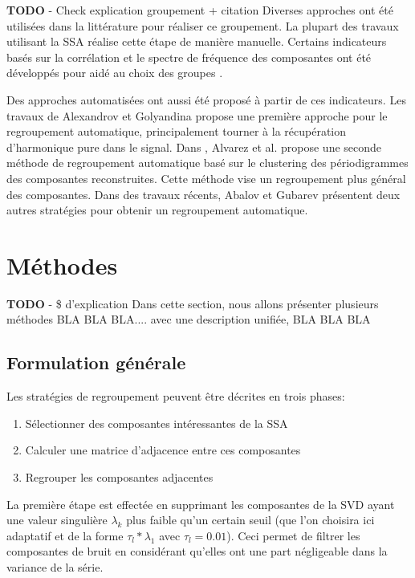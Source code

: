 \documentclass{gretsi}
\begin{document}
{\color{red} \textbf{TODO} - Check explication groupement + citation} 
Diverses approches ont été utilisées dans la littérature pour réaliser ce groupement. La plupart des travaux utilisant la SSA réalise cette étape de manière manuelle. Certains indicateurs basés sur la corrélation et le spectre de fréquence des composantes ont été développés pour aidé au choix des groupes \cite{GNZ_10_SSA}.

Des approches automatisées ont aussi été proposé à partir de ces indicateurs. Les travaux de Alexandrov et Golyandina \cite{alexandrov_05_auto} propose une première approche pour le regroupement automatique, principalement tourner à la récupération d'harmonique pure dans le signal. Dans \cite{alvarez_2013_auto}, Alvarez et al. propose une seconde méthode de regroupement automatique basé sur le clustering des périodigrammes des composantes reconstruites. Cette méthode vise un regroupement plus général des composantes. Dans des travaux récents, Abalov et Gubarev \cite{abalov_14_auto} présentent deux autres stratégies pour obtenir un regroupement automatique. 



\section{Méthodes}
{\color{red} \textbf{TODO} - \$ d'explication} 
Dans cette section, nous allons présenter plusieurs méthodes BLA BLA BLA.... avec une description unifiée, BLA BLA BLA


\subsection{Formulation générale}
\label{sub:form}

Les stratégies de regroupement peuvent être décrites en trois phases:
\begin{enumerate}
	\item Sélectionner des composantes intéressantes de la SSA
	\item Calculer une matrice d'adjacence entre ces composantes
	\item Regrouper les composantes adjacentes
\end{enumerate}
La première étape est effectée en supprimant les composantes de la SVD ayant une valeur singulière $\lambda_k$ plus faible qu'un certain seuil (que l'on choisira ici adaptatif et de la forme  $\tau_l*\lambda_1$ avec $\tau_l = 0.01$). Ceci permet de filtrer les composantes de bruit en considérant qu'elles ont une part négligeable dans la variance de la série. 
\end{document}
